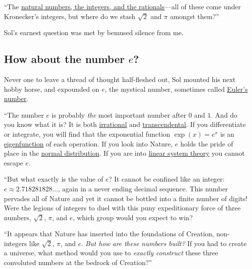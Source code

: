 \documentclass[
  a4paper,
]{article}
\begin{document}
``The
\href{https://swanlotus.netlify.app/blogs/the-two-most-important-numbers-zero-and-one}{natural
numbers, the integers, and the rationals}---all of these come under
Kronecker's integers, but where do we stash \(\sqrt{2}\) and \(\pi\)
amongst them?''

Sol's earnest question was met by bemused silence from me.

\subsection{\texorpdfstring{How about the number
\(e\)?}{How about the number e?}}\label{how-about-the-number-e}

Never one to leave a thread of thought half-fleshed out, Sol mounted his
next hobby horse, and expounded on
\href{https://en.wikipedia.org/wiki/E_(mathematical_constant)}{\(e\)},
the mystical number, sometimes called
\href{https://en.wikipedia.org/wiki/E_(mathematical_constant)}{Euler's
number}.

``The number \(e\) is probably \emph{the} most important number after
\(0\) and \(1\). And do you know what it is? It is both
\href{https://mathworld.wolfram.com/IrrationalNumber.html}{irrational}
and
\href{https://en.wikipedia.org/wiki/Transcendental_number}{transcendental}.
If you differentiate or integrate, you will find that the exponential
function \(\exp(x) = e^x\) is an
\href{https://swanlotus.netlify.app/blogs/eigenvalues-and-eigenvectors-why-are-they-important}{eigenfunction}
of each operation. If you look into Nature, \(e\) holds the pride of
place in the
\href{https://www.khanacademy.org/math/statistics-probability/modeling-distributions-of-data/normal-distributions-library/a/normal-distributions-review}{normal
distribution}. If you are into
\href{https://www.cns.nyu.edu/~david/handouts/linear-systems/linear-systems.html}{linear
system theory} you cannot escape \(e\).

``But what exactly is the value of \(e\)? It cannot be confined like an
integer: \(e \approx 2.718281828\dots\), again in a never ending decimal
sequence. This number pervades all of Nature and yet it cannot be
bottled into a finite number of digits! Were the legions of integers to
duel with this puny expeditionary force of three numbers, \(\sqrt{2}\),
\(\pi\), and \(e\), which group would you expect to win?

``It appears that Nature has inserted into the foundations of Creation,
non-integers like \(\sqrt{2}\), \(\pi\), and \(e\). \emph{But how are
these numbers built?} If you had to create a universe, what method would
you use to \emph{exactly construct} these three convoluted numbers at
the bedrock of Creation?''
\end{document}

